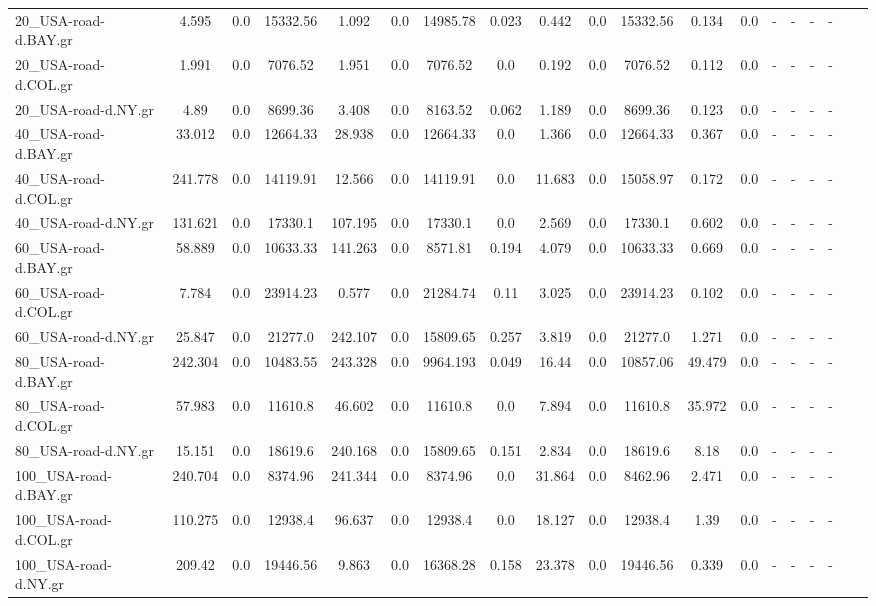 \begin{sidewaystable}[!h]
\begin{tabular}{lcccccccccccccccccc}
20_USA-road-d.BAY.gr & 4.595 & 0.0 & 15332.56 & 1.092 & 0.0 & 14985.78 & 0.023 & 0.442 & 0.0 & 15332.56 & 0.134 & 0.0 & - & - & - & - \\
20_USA-road-d.COL.gr & 1.991 & 0.0 & 7076.52 & 1.951 & 0.0 & 7076.52 & 0.0 & 0.192 & 0.0 & 7076.52 & 0.112 & 0.0 & - & - & - & - \\
20_USA-road-d.NY.gr & 4.89 & 0.0 & 8699.36 & 3.408 & 0.0 & 8163.52 & 0.062 & 1.189 & 0.0 & 8699.36 & 0.123 & 0.0 & - & - & - & - \\
40_USA-road-d.BAY.gr & 33.012 & 0.0 & 12664.33 & 28.938 & 0.0 & 12664.33 & 0.0 & 1.366 & 0.0 & 12664.33 & 0.367 & 0.0 & - & - & - & - \\
40_USA-road-d.COL.gr & 241.778 & 0.0 & 14119.91 & 12.566 & 0.0 & 14119.91 & 0.0 & 11.683 & 0.0 & 15058.97 & 0.172 & 0.0 & - & - & - & - \\
40_USA-road-d.NY.gr & 131.621 & 0.0 & 17330.1 & 107.195 & 0.0 & 17330.1 & 0.0 & 2.569 & 0.0 & 17330.1 & 0.602 & 0.0 & - & - & - & - \\
60_USA-road-d.BAY.gr & 58.889 & 0.0 & 10633.33 & 141.263 & 0.0 & 8571.81 & 0.194 & 4.079 & 0.0 & 10633.33 & 0.669 & 0.0 & - & - & - & - \\
60_USA-road-d.COL.gr & 7.784 & 0.0 & 23914.23 & 0.577 & 0.0 & 21284.74 & 0.11 & 3.025 & 0.0 & 23914.23 & 0.102 & 0.0 & - & - & - & - \\
60_USA-road-d.NY.gr & 25.847 & 0.0 & 21277.0 & 242.107 & 0.0 & 15809.65 & 0.257 & 3.819 & 0.0 & 21277.0 & 1.271 & 0.0 & - & - & - & - \\
80_USA-road-d.BAY.gr & 242.304 & 0.0 & 10483.55 & 243.328 & 0.0 & 9964.193 & 0.049 & 16.44 & 0.0 & 10857.06 & 49.479 & 0.0 & - & - & - & - \\
80_USA-road-d.COL.gr & 57.983 & 0.0 & 11610.8 & 46.602 & 0.0 & 11610.8 & 0.0 & 7.894 & 0.0 & 11610.8 & 35.972 & 0.0 & - & - & - & - \\
80_USA-road-d.NY.gr & 15.151 & 0.0 & 18619.6 & 240.168 & 0.0 & 15809.65 & 0.151 & 2.834 & 0.0 & 18619.6 & 8.18 & 0.0 & - & - & - & - \\
100_USA-road-d.BAY.gr & 240.704 & 0.0 & 8374.96 & 241.344 & 0.0 & 8374.96 & 0.0 & 31.864 & 0.0 & 8462.96 & 2.471 & 0.0 & - & - & - & - \\
100_USA-road-d.COL.gr & 110.275 & 0.0 & 12938.4 & 96.637 & 0.0 & 12938.4 & 0.0 & 18.127 & 0.0 & 12938.4 & 1.39 & 0.0 & - & - & - & - \\
100_USA-road-d.NY.gr & 209.42 & 0.0 & 19446.56 & 9.863 & 0.0 & 16368.28 & 0.158 & 23.378 & 0.0 & 19446.56 & 0.339 & 0.0 & - & - & - & - \\

\end{tabular}
\end{sidewaystable}
